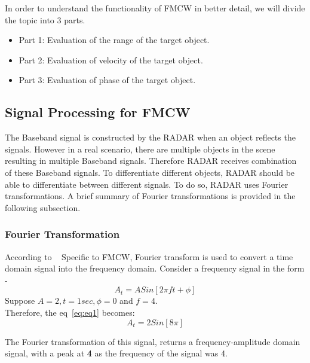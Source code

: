 In order to understand the functionality of FMCW in better detail, we will divide the topic into 3 parts.
\begin{itemize}
    \item Part 1: Evaluation of the range of the target object.
    \item Part 2: Evaluation of velocity of the target object.
    \item Part 3: Evaluation of phase of the target object.
\end{itemize}

\subsection{Signal Processing for FMCW}
\label{Signal Processing for FMCW}
The Baseband signal is constructed by the RADAR when an object reflects the signals. However in a real scenario, there are multiple objects in the scene resulting in multiple Baseband signals. Therefore RADAR receives combination of these Baseband signals. To differentiate different objects, RADAR should be able to differentiate between different signals. To do so, RADAR uses Fourier transformations. A brief summary of Fourier transformations is provided in the following subsection.


\subsubsection*{Fourier Transformation} \label{sec:FT}
According to ~\cite{FT}
Specific to FMCW, Fourier transform is used to convert a time domain signal into the frequency domain. 
Consider a frequency signal in the form -  
\begin{equation}\label{eq:eq1}
A_{t}= ASin[2\pi ft + \phi]
\end{equation}
Suppose \(A =2, t= 1 sec, \phi = 0\) and \(f = 4\).
\\
Therefore, the eq~\eqref{eq:eq1} becomes:
\begin{equation}
A_{t}= 2Sin[8\pi]    
\end{equation}

The Fourier transformation of this signal, returns a frequency-amplitude domain signal, with a peak at \textbf{4} as the frequency of the signal was 4.

